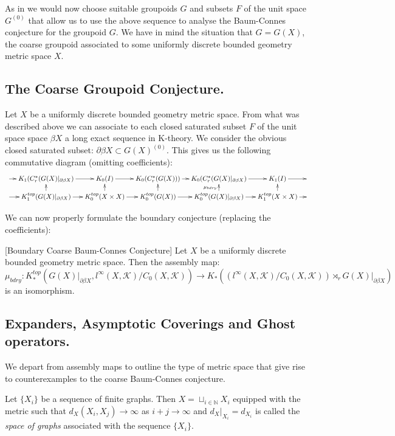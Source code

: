 \begin{conjecture}
{As in \cite{MR1911663} we would now choose suitable groupoids $G$ and subsets $F$ of the unit space $G^{(0)}$ that allow us to use the above sequence to analyse the Baum-Connes conjecture for the groupoid $G$. We have in mind the situation that $G=G(X)$, the coarse groupoid associated to some uniformly discrete bounded geometry metric space $X$.

\subsection{The Coarse Groupoid Conjecture.}
Let $X$ be a uniformly discrete bounded geometry metric space. From what was described above we can associate to each closed saturated subset $F$ of the unit space space $\beta X$ a long exact sequence in K-theory. We consider the obvious closed saturated subset: $\partial \beta X \subset G(X)^{(0)}$. This gives us the following commutative diagram (omitting coefficients):
\begin{equation*}
\xymatrix@=1em{
\ar[r] & K_{1}(C^{*}_{r}(G(X)|_{\partial\beta X}) \ar[r] & K_{0}(I) \ar[r]& K_{0}(C^{*}_{r}(G(X))) \ar[r]& K_{0}(C^{*}_{r}(G(X)|_{\partial\beta X})\ar[r] & K_{1}(I)\ar[r] &  \\
\ar[r] & K_{1}^{top}(G(X)|_{\partial\beta X}) \ar[r] \ar[u]& K_{0}^{top}(X \times X) \ar[r]\ar[u]& K_{0}^{top}(G(X)) \ar[r]\ar[u]& K_{0}^{top}(G(X)|_{\partial\beta X}) \ar[r]\ar[u]^{\mu_{bdry}}& K_{1}^{top}(X \times X)\ar[u]\ar[r] &
}
\end{equation*}

We can now properly formulate the boundary conjecture (replacing the coefficients):

\begin{conj}\label{MC:S1} [Boundary Coarse Baum-Connes Conjecture]
Let $X$ be a uniformly discrete bounded geometry metric space. Then the assembly map:
\begin{equation*}
\mu_{bdry}:K_{*}^{top}(G(X)|_{\partial\beta X}, l^{\infty}(X,\mathcal{K})/C_{0}(X,\mathcal{K})) \rightarrow K_{*}((l^{\infty}(X,\mathcal{K})/C_{0}(X,\mathcal{K}))\rtimes_{r}G(X)|_{\partial\beta X})
\end{equation*}
is an isomorphism.
\end{conj}
\subsection{Expanders, Asymptotic Coverings and Ghost operators.}\label{Sect:GO}
We depart from assembly maps to outline the type of metric space that give rise to counterexamples to the coarse Baum-Connes conjecture.
\begin{definition}
Let $\lbrace X_{i} \rbrace$ be a sequence of finite graphs. Then $X=\sqcup_{i\in\mathbb{N}}X_{i}$ equipped with the metric such that $d_{X}(X_{i},X_{j})\rightarrow \infty$ as $i+j\rightarrow \infty$ and $d_{X}|_{X_{i}}=d_{X_{i}}$ is called the \textit{space of graphs} associated with the sequence $\lbrace X_{i} \rbrace$. 
\end{definition}

}
\end{conjecture}
